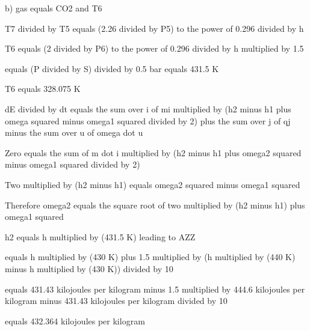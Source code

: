 b) gas equals CO2 and T6

T7 divided by T5 equals (2.26 divided by P5) to the power of 0.296 divided by h

T6 equals (2 divided by P6) to the power of 0.296 divided by h multiplied by 1.5

equals (P divided by S) divided by 0.5 bar equals 431.5 K

T6 equals 328.075 K

dE divided by dt equals the sum over i of mi multiplied by (h2 minus h1 plus omega squared minus omega1 squared divided by 2) plus the sum over j of qj minus the sum over u of omega dot u

Zero equals the sum of m dot i multiplied by (h2 minus h1 plus omega2 squared minus omega1 squared divided by 2)

Two multiplied by (h2 minus h1) equals omega2 squared minus omega1 squared

Therefore omega2 equals the square root of two multiplied by (h2 minus h1) plus omega1 squared

h2 equals h multiplied by (431.5 K) leading to AZZ

equals h multiplied by (430 K) plus 1.5 multiplied by (h multiplied by (440 K) minus h multiplied by (430 K)) divided by 10

equals 431.43 kilojoules per kilogram minus 1.5 multiplied by 444.6 kilojoules per kilogram minus 431.43 kilojoules per kilogram divided by 10

equals 432.364 kilojoules per kilogram